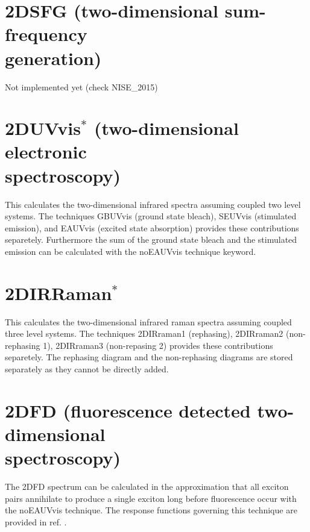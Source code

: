 \section{2DSFG (two-dimensional sum-frequency\\ generation)}
 Not implemented yet (check NISE\_2015)
\section{2DUVvis$^{*}$ (two-dimensional electronic\\ spectroscopy)}
This calculates the two-dimensional infrared spectra assuming coupled two level systems. The techniques GBUVvis (ground state bleach), SEUVvis (stimulated emission), and EAUVvis (excited state absorption) provides these contributions separetely. Furthermore the sum of the ground state bleach and the stimulated emission can be calculated with the noEAUVvis technique keyword. 
\section{2DIRRaman$^{*}$}
This calculates the two-dimensional infrared raman spectra assuming coupled three level systems. The techniques 2DIRraman1 (rephasing), 2DIRraman2 (non-rephasing 1), 2DIRraman3 (non-repasing 2) provides these contributions separetely. The rephasing diagram and the non-rephasing diagrams are stored separately as they cannot be directly added. %
\section{2DFD (fluorescence detected two-dimensional\\ spectroscopy)}
 The 2DFD spectrum can be calculated in the approximation that all exciton pairs annihilate to produce a single exciton long before fluorescence occur with the noEAUVvis technique. The response functions governing this technique are provided in ref. \cite{Kunsel_2018}.
